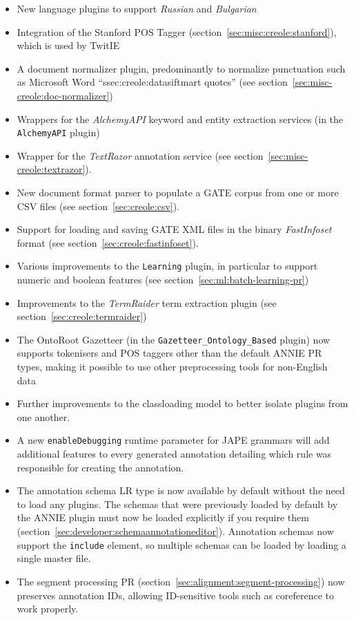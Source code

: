 \begin{itemize}
\item New language plugins to support \emph{Russian} and \emph{Bulgarian}
\item Integration of the Stanford POS Tagger
  (section~\ref{sec:misc:creole:stanford}), which is used by TwitIE
\item A document normalizer plugin, predominantly to normalize punctuation such
  as Microsoft Word ``ssec:creole:datasiftmart quotes'' (see
  section~\ref{sec:misc-creole:doc-normalizer})
\item Wrappers for the \emph{AlchemyAPI} keyword and entity extraction services
  (in the \verb!AlchemyAPI! plugin)
\item Wrapper for the \emph{TextRazor} annotation service (see
  section~\ref{sec:misc-creole:textrazor}).
\item New document format parser to populate a GATE corpus from one or more CSV
  files (see section~\ref{sec:creole:csv}).
\item Support for loading and saving GATE XML files in the binary
  \emph{FastInfoset} format (see section~\ref{sec:creole:fastinfoset}).
\item Various improvements to the \verb!Learning! plugin, in particular to
  support numeric and boolean features (see
  section~\ref{sec:ml:batch-learning-pr})
\item Improvements to the \emph{TermRaider} term extraction plugin (see
  section~\ref{sec:creole:termraider})
\item The OntoRoot Gazetteer (in the \verb!Gazetteer_Ontology_Based! plugin)
  now supports tokenisers and POS taggers other than the default ANNIE PR
  types, making it possible to use other preprocessing tools for non-English
  data
\item Further improvements to the classloading model to better isolate plugins
  from one another.
\item A new \verb!enableDebugging! runtime parameter for JAPE grammars will add
  additional features to every generated annotation detailing which rule was
  responsible for creating the annotation.
\end{itemize}


\begin{itemize}
\item The annotation schema LR type is now available by default without the
  need to load any plugins.  The schemas that were previously loaded by default
  by the ANNIE plugin must now be loaded explicitly if you require them
  (section~\ref{sec:developer:schemaannotationeditor}).  Annotation schemas now
  support the \verb!include! element, so multiple schemas can be loaded by
  loading a single master file.
\item The segment processing PR
  (section~\ref{sec:alignment:segment-processing}) now preserves annotation
  IDs, allowing ID-sensitive tools such as coreference to work properly.
\end{itemize}

